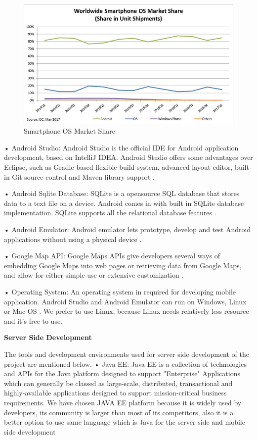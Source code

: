 \begin{figure}[!htbp]
\centering
\includegraphics[width=\textwidth]{projectChapters/images/androidmarketplace.jpg}
\caption{Smartphone OS Market Share \cite{AndroidMarketShare}}
\label{fig:marketplace}
\end{figure}

• Android Studio: Android Studio is the official IDE for Android application
development, based on IntelliJ IDEA. Android Studio offers some advantages
over Eclipse, such as Gradle based flexible build system, advanced layout editor,
built-in Git source control and Maven library support \cite{androidStudio}.

• Android Sqlite Database: SQLite is a opensource SQL database that stores data to a text file on a device. Android comes in with built in SQLite database implementation. SQLite supports all the relational database features \cite{androidStudioSqlite}.

• Android Emulator: Android emulator lets prototype, develop and test Android applications without using a physical device \cite{androidEmulator}.

• Google Map API: Google Maps APIs give developers several ways of embedding Google Maps into web pages or retrieving data from Google Maps, and allow for either simple use or extensive customization \cite{googleMapAPI}.

• Operating System: An operating system in required for developing mobile application. Android Studio and Android Emulator can run on Windows, Linux or Mac OS \cite{mac}. We prefer to use Linux, because Linux needs relatively less resource and it's free to use. 

\textbf{Server Side Development}

The tools and development environments used for server side development of the
project are mentioned below.
\newline
• Java EE: Java EE is a collection of technologies and APIs for the Java platform designed to support "Enterprise" Applications which can generally be classed as large-scale, distributed, transactional and highly-available applications designed to support mission-critical business requirements. \cite{javaEETanim}
We have chosen JAVA EE platform because it is widely used by developers, its community is larger than most of its competitors, also it is a better option to use same language which is Java for the server side and mobile side development

